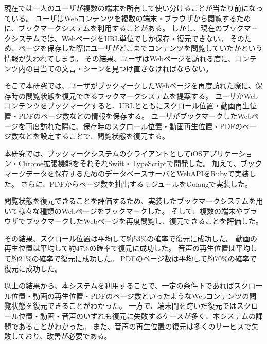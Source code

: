 \begin{jabstract}

  現在では一人のユーザが複数の端末を所有して使い分けることが当たり前になっている。
  ユーザはWebコンテンツを複数の端末・ブラウザから閲覧するために、ブックマークシステムを利用することがある。
  しかし、現在のブックマークシステムでは、WebページをURL単位でしか保存・復元できない。
  そのため、ページを保存した際にユーザがどこまでコンテンツを閲覧していたかという情報が失われてしまう。
  その結果、ユーザはWebページを訪れる度に、コンテンツ内の目当ての文言・シーンを見つけ直さなければならない。  

  そこで本研究では、ユーザがブックマークしたWebページを再度訪れた際に、保存時の閲覧状態を復元できるブックマークシステムを提案する。
  ユーザがWebコンテンツをブックマークすると、URLとともにスクロール位置・動画再生位置・PDFのページ数などの情報を保存する。
  ユーザがブックマークしたWebページを再度訪れた際に、保存時のスクロール位置・動画再生位置・PDFのページ数などを設定することで、閲覧状態を復元する。

  本研究では、ブックマークシステムのクライアントとしてiOSアプリケーション・Chrome拡張機能をそれぞれSwift・TypeScriptで開発した。
  加えて、ブックマークデータを保存するためのデータベースサーバとWebAPIをRubyで実装した。
  さらに、PDFからページ数を抽出するモジュールをGolangで実装した。

  閲覧状態を復元できることを評価するため、実装したブックマークシステムを用いて様々な種類のWebページをブックマークした。
  そして、複数の端末やブラウザでブックマークしたWebページを再度閲覧し、復元できることを評価した。

  その結果、スクロール位置は平均して約53\%の確率で復元に成功した。
  動画の再生位置は平均して約47\%の確率で復元に成功した。
  音声の再生位置は平均して約21\%の確率で復元に成功した。
  PDFのページ数は平均して約70\%の確率で復元に成功した。

  以上の結果から、本システムを利用することで、一定の条件下であればスクロール位置・動画の再生位置・PDFのページ数といったようなWebコンテンツの閲覧状態を復元できることがわかった。
  一方で、端末間を跨いだ復元ではスクロール位置・動画・音声のいずれも復元に失敗するケースが多く、本システムの課題であることがわかった。
  また、音声の再生位置の復元は多くのサービスで失敗しており、改善が必要である。

\end{jabstract}
